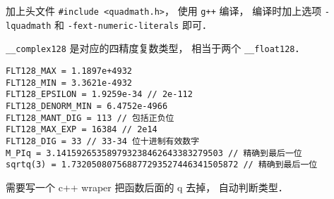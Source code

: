 加上头文件 \verb|#include <quadmath.h>|， 使用 \verb|g++| 编译， 编译时加上选项 \verb|-lquadmath| 和 \verb|-fext-numeric-literals| 即可．

\verb|__complex128| 是对应的四精度复数类型， 相当于两个 \verb|__float128|．

\begin{lstlisting}
FLT128_MAX = 1.1897e+4932
FLT128_MIN = 3.3621e-4932
FLT128_EPSILON = 1.9259e-34 // 2e-112
FLT128_DENORM_MIN = 6.4752e-4966
FLT128_MANT_DIG = 113 // 包括正负位
FLT128_MAX_EXP = 16384 // 2e14
FLT128_DIG = 33 // 33-34 位十进制有效数字
M_PIq = 3.141592653589793238462643383279503 // 精确到最后一位
sqrtq(3) = 1.732050807568877293527446341505872 // 精确到最后一位
\end{lstlisting}
需要写一个 c++ wraper 把函数后面的 q 去掉， 自动判断类型．
